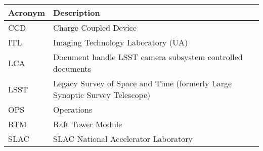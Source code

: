\addtocounter{table}{-1}
\begin{longtable}{p{}p{}}\hline
\textbf{Acronym} & \textbf{Description}  \\\hline

CCD & Charge-Coupled Device \\\hline
ITL & Imaging Technology Laboratory (UA) \\\hline
LCA & Document handle LSST camera subsystem controlled documents \\\hline
LSST & Legacy Survey of Space and Time (formerly Large Synoptic Survey Telescope) \\\hline
OPS & Operations \\\hline
RTM & Raft Tower Module \\\hline
SLAC & SLAC National Accelerator Laboratory \\\hline
\end{longtable}
